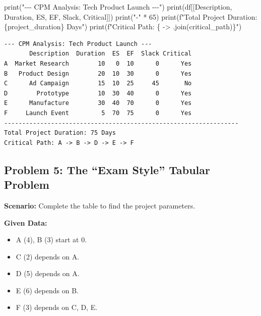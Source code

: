 \documentclass[
  letterpaper,
  DIV=11,
  numbers=noendperiod]{scrreprt}
\newenvironment{Shaded}{\begin{snugshade}}{\end{snugshade}}
\newcommand{\BuiltInTok}[1]{\textcolor[rgb]{0.00,0.23,0.31}{#1}}
\newcommand{\DecValTok}[1]{\textcolor[rgb]{0.68,0.00,0.00}{#1}}
\newcommand{\NormalTok}[1]{\textcolor[rgb]{0.00,0.23,0.31}{#1}}
\newcommand{\OperatorTok}[1]{\textcolor[rgb]{0.37,0.37,0.37}{#1}}
\newcommand{\SpecialCharTok}[1]{\textcolor[rgb]{0.37,0.37,0.37}{#1}}
\newcommand{\SpecialStringTok}[1]{\textcolor[rgb]{0.13,0.47,0.30}{#1}}
\newcommand{\StringTok}[1]{\textcolor[rgb]{0.13,0.47,0.30}{#1}}
\providecommand{\tightlist}{%
  \setlength{\itemsep}{0pt}\setlength{\parskip}{0pt}}
\begin{document}
\begin{Shaded}
\begin{Highlighting}[]
\BuiltInTok{print}\NormalTok{(}\StringTok{"{-}{-}{-} CPM Analysis: Tech Product Launch {-}{-}{-}"}\NormalTok{)}
\BuiltInTok{print}\NormalTok{(df[[}\StringTok{\textquotesingle{}Description\textquotesingle{}}\NormalTok{, }\StringTok{\textquotesingle{}Duration\textquotesingle{}}\NormalTok{, }\StringTok{\textquotesingle{}ES\textquotesingle{}}\NormalTok{, }\StringTok{\textquotesingle{}EF\textquotesingle{}}\NormalTok{, }\StringTok{\textquotesingle{}Slack\textquotesingle{}}\NormalTok{, }\StringTok{\textquotesingle{}Critical\textquotesingle{}}\NormalTok{]])}
\BuiltInTok{print}\NormalTok{(}\StringTok{"{-}"} \OperatorTok{*} \DecValTok{65}\NormalTok{)}
\BuiltInTok{print}\NormalTok{(}\SpecialStringTok{f"Total Project Duration: }\SpecialCharTok{\{}\NormalTok{project\_duration}\SpecialCharTok{\}}\SpecialStringTok{ Days"}\NormalTok{)}
\BuiltInTok{print}\NormalTok{(}\SpecialStringTok{f"Critical Path: }\SpecialCharTok{\{}\StringTok{\textquotesingle{} {-}\textgreater{} \textquotesingle{}}\SpecialCharTok{.}\NormalTok{join(critical\_path)}\SpecialCharTok{\}}\SpecialStringTok{"}\NormalTok{)}
\end{Highlighting}
\end{Shaded}

\begin{verbatim}
--- CPM Analysis: Tech Product Launch ---
       Description  Duration  ES  EF  Slack Critical
A  Market Research        10   0  10      0      Yes
B   Product Design        20  10  30      0      Yes
C      Ad Campaign        15  10  25     45       No
D        Prototype        10  30  40      0      Yes
E      Manufacture        30  40  70      0      Yes
F     Launch Event         5  70  75      0      Yes
-----------------------------------------------------------------
Total Project Duration: 75 Days
Critical Path: A -> B -> D -> E -> F
\end{verbatim}

\subsection{Problem 5: The ``Exam Style'' Tabular
Problem}\label{problem-5-the-exam-style-tabular-problem}

\textbf{Scenario:} Complete the table to find the project parameters.

\textbf{Given Data:}

\begin{itemize}
\tightlist
\item
  A (4), B (3) start at 0.
\item
  C (2) depends on A.
\item
  D (5) depends on A.
\item
  E (6) depends on B.
\item
  F (3) depends on C, D, E.
\end{itemize}
\end{document}
